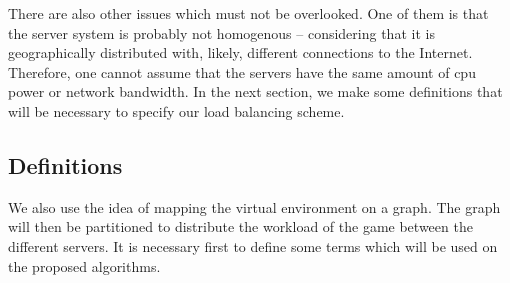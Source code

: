 There are also other issues which must not be overlooked. One of them is that the server system is probably not homogenous -- considering that it is geographically distributed with, likely, different connections to the Internet. Therefore, one cannot assume that the servers have the same amount of cpu power or network bandwidth. %
In the next section, we make some definitions that will be necessary to specify our load balancing scheme.


	

\subsection{Definitions}
\label{sec:def}

We also use the idea of mapping the virtual environment on a graph. The graph will then be partitioned to distribute the workload of the game between the different servers. It is necessary first to define some terms which will be used on the proposed algorithms.


